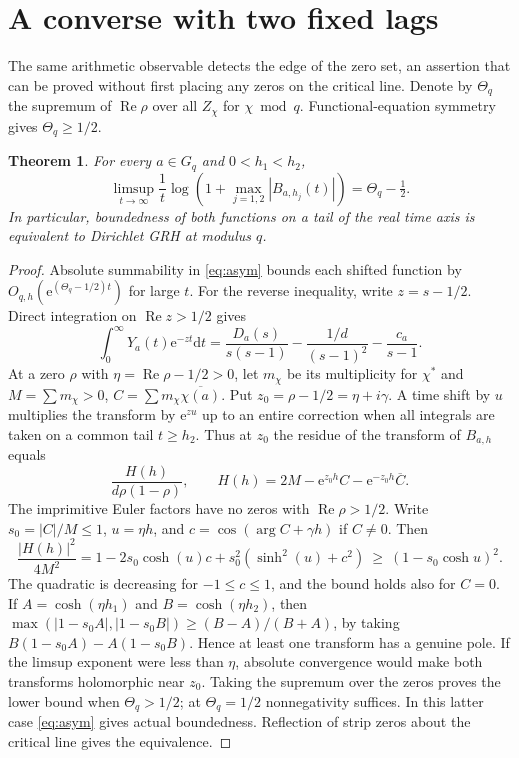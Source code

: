 \documentclass[11pt]{article}
\newtheorem{theorem}{Theorem}
\newcommand{\dd}{\mathrm d}
\newcommand{\e}{\mathrm e}
\newcommand{\re}{\operatorname{Re}}
\begin{document}
\section{A converse with two fixed lags}
The same arithmetic observable detects the edge of the zero set, an assertion that can be proved without first placing any zeros on the critical line. Denote by $\Theta_q$ the supremum of $\re\rho$ over all $Z_\chi$ for $\chi\bmod q$. Functional-equation symmetry gives $\Theta_q\ge1/2$.
\begin{theorem}\label{th:two}
For every $a\in G_q$ and $0<h_1<h_2$,
\[
 \limsup_{t\to\infty}\frac1t\log\left(1+\max_{j=1,2}|B_{a,h_j}(t)|\right)
     =\Theta_q-\tfrac12 .
\]
In particular, boundedness of both functions on a tail of the real time axis is equivalent to Dirichlet GRH at modulus $q$.
\end{theorem}
\begin{proof}
Absolute summability in \eqref{eq:asym} bounds each shifted function by $O_{q,h}(\e^{(\Theta_q-1/2)t})$ for large $t$. For the reverse inequality, write $z=s-1/2$. Direct integration on $\re z>1/2$ gives
\[
 \int_0^\infty Y_a(t)\e^{-zt}\dd t
   =\frac{D_a(s)}{s(s-1)}-\frac{1/d}{(s-1)^2}-\frac{c_a}{s-1}.
\]
At a zero $\rho$ with $\eta=\re\rho-1/2>0$, let $m_\chi$ be its multiplicity for $\chi^*$ and $M=\sum m_\chi>0$, $C=\sum m_\chi\overline{\chi(a)}$. Put $z_0=\rho-1/2=\eta+i\gamma$. A time shift by $u$ multiplies the transform by $\e^{zu}$ up to an entire correction when all integrals are taken on a common tail $t\ge h_2$. Thus at $z_0$ the residue of the transform of $B_{a,h}$ equals
\[
 \frac{H(h)}{d\rho(1-\rho)},\qquad
 H(h)=2M-\e^{z_0h}C-\e^{-z_0h}\overline C.
\]
The imprimitive Euler factors have no zeros with $\re\rho>1/2$. Write $s_0=|C|/M\le1$, $u=\eta h$, and $c=\cos(\arg C+\gamma h)$ if $C\ne0$. Then
\[
 \frac{|H(h)|^2}{4M^2}
 =1-2s_0\cosh(u)c+s_0^2(\sinh^2(u)+c^2)
 \ \ge\ (1-s_0\cosh u)^2.
\]
The quadratic is decreasing for $-1\le c\le1$, and the bound holds also for $C=0$. If $A=\cosh(\eta h_1)$ and $B=\cosh(\eta h_2)$, then
$\max(|1-s_0 A|,|1-s_0 B|)\ge (B-A)/(B+A)$, by taking $B(1-s_0 A)-A(1-s_0 B)$. Hence at least one transform has a genuine pole. If the limsup exponent were less than $\eta$, absolute convergence would make both transforms holomorphic near $z_0$. Taking the supremum over the zeros proves the lower bound when $\Theta_q>1/2$; at $\Theta_q=1/2$ nonnegativity suffices. In this latter case \eqref{eq:asym} gives actual boundedness. Reflection of strip zeros about the critical line gives the equivalence.
\end{proof}
\end{document}
